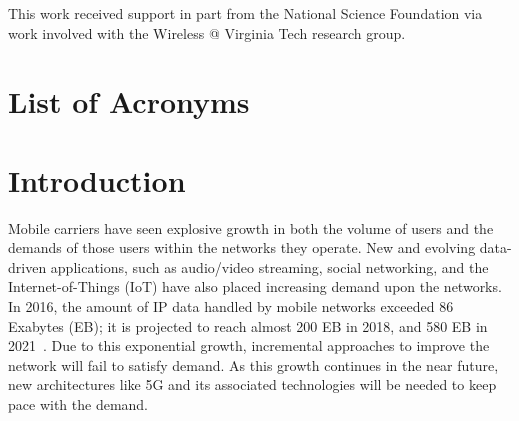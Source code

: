 \documentclass[12pt,dvipsnames]{report}
\begin{document}
\vfill

This work received support in part from the National Science Foundation via work involved with the Wireless @ Virginia Tech research group.

\pagebreak

\tableofcontents
\pagebreak

\listoffigures
\pagebreak

\listoftables
\pagebreak

\chapter*{List of Acronyms}
\begin{acronym}
\end{acronym}

\pagestyle{myheadings}

\iftrue
\chapter{Introduction} \label{ch:intro}

Mobile carriers have seen explosive growth in both the volume of users and the demands of those users within the networks they operate.  New and evolving data-driven applications, such as audio/video streaming, social networking, and the Internet-of-Things (IoT) have also placed increasing demand upon the networks.  In 2016, the amount of IP data handled by mobile networks exceeded 86 Exabytes (EB); it is projected to reach almost 200 EB in 2018, and 580 EB in 2021~\cite{ciscoVNI2017}.  Due to this exponential growth, incremental approaches to improve the network will fail to satisfy demand.  As this growth continues in the near future, new architectures like 5G and its associated technologies will be needed to keep pace with the demand.
\end{document}
